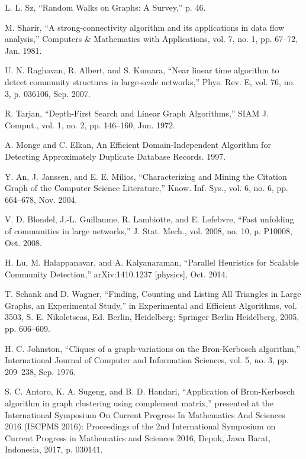 \documentclass[journal,twoside,web]{ieeecolor}
\begin{document}
\begin{thebibliography}{9}
    L. L. Sz, “Random Walks on Graphs: A Survey,” p. 46.
    
    M. Sharir, “A strong-connectivity algorithm and its applications in data flow analysis,” Computers \& Mathematics with Applications, vol. 7, no. 1, pp. 67–72, Jan. 1981.
    
    U. N. Raghavan, R. Albert, and S. Kumara, “Near linear time algorithm to detect community structures in large-scale networks,” Phys. Rev. E, vol. 76, no. 3, p. 036106, Sep. 2007.
    
    R. Tarjan, “Depth-First Search and Linear Graph Algorithms,” SIAM J. Comput., vol. 1, no. 2, pp. 146–160, Jun. 1972.
    
    A. Monge and C. Elkan, An Efficient Domain-Independent Algorithm for Detecting Approximately Duplicate Database Records. 1997.
    
    Y. An, J. Janssen, and E. E. Milios, “Characterizing and Mining the Citation Graph of the Computer Science Literature,” Know. Inf. Sys., vol. 6, no. 6, pp. 664–678, Nov. 2004.
    
    V. D. Blondel, J.-L. Guillaume, R. Lambiotte, and E. Lefebvre, “Fast unfolding of communities in large networks,” J. Stat. Mech., vol. 2008, no. 10, p. P10008, Oct. 2008.
    
    H. Lu, M. Halappanavar, and A. Kalyanaraman, “Parallel Heuristics for Scalable Community Detection,” arXiv:1410.1237 [physics], Oct. 2014.
    
    T. Schank and D. Wagner, “Finding, Counting and Listing All Triangles in Large Graphs, an Experimental Study,” in Experimental and Efficient Algorithms, vol. 3503, S. E. Nikoletseas, Ed. Berlin, Heidelberg: Springer Berlin Heidelberg, 2005, pp. 606–609.
    
    H. C. Johnston, “Cliques of a graph-variations on the Bron-Kerbosch algorithm,” International Journal of Computer and Information Sciences, vol. 5, no. 3, pp. 209–238, Sep. 1976.
    
    S. C. Antoro, K. A. Sugeng, and B. D. Handari, “Application of Bron-Kerbosch algorithm in graph clustering using complement matrix,” presented at the International Symposium On Current Progress In Mathematics And Sciences 2016 (ISCPMS 2016): Proceedings of the 2nd International Symposium on Current Progress in Mathematics and Sciences 2016, Depok, Jawa Barat, Indonesia, 2017, p. 030141.
    

\end{thebibliography}
\end{document}
